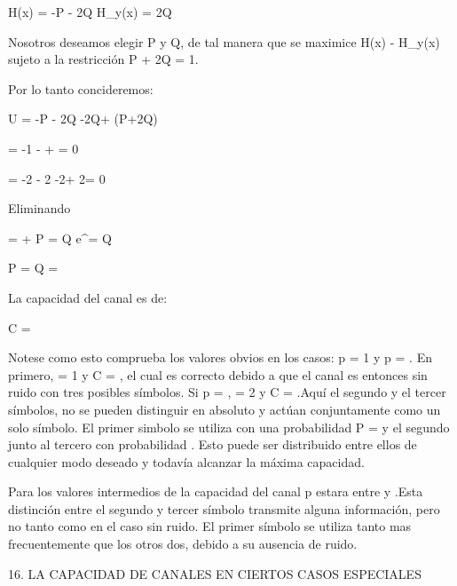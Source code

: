 \begin{center}
H(x) = -P - 2Q
H_y(x) = 2Q\alpha
\end{center}


Nosotros deseamos elegir P y Q, de tal manera que se maximice H(x) - H_y(x) sujeto a la restricci\'on P + 2Q = 1. 

Por lo tanto concideremos:

\begin{center}
U = -P - 2Q -2Q\alfa + \lambda(P+2Q)

 = -1 -  + \lambda = 0

 = -2 - 2 -2\alpha + 2\lambda = 0
\end{center}


Eliminando \lamda

\begin{center}
 =  + \alpha
P = Q e^\alpha = Q\beta 
\end{center}

\begin{center}
P =    Q = 
\end{center}

La capacidad del canal es de:

\begin{center}
C = 
\end{center}

Notese como esto comprueba los valores obvios en los casos: p = 1 y p = . En primero, \beta = 1 y C = , 
el cual es correcto debido a que el canal es entonces sin ruido con tres posibles s\'imbolos. Si p = , \beta = 2 y 
C = .Aqu\'i el segundo y el tercer s\'imbolos, no se pueden distinguir en absoluto y act\'uan conjuntamente como un solo 
s\'imbolo. El primer simbolo se utiliza con una probabilidad P =   y el segundo junto al tercero con probabilidad .
Esto puede ser distribuido entre ellos de cualquier modo deseado y todav\'ia alcanzar la m\'axima capacidad.

Para los valores intermedios de la capacidad del canal p estara entre  y .Esta distinci\'on 
entre el segundo y tercer s\'imbolo transmite alguna informaci\'on, pero no tanto como en el caso sin ruido.
El primer s\'imbolo se utiliza tanto mas frecuentemente que los otros dos, debido a su ausencia de ruido.

\begin{center}
16. LA CAPACIDAD DE CANALES EN CIERTOS CASOS ESPECIALES
\end{center}

